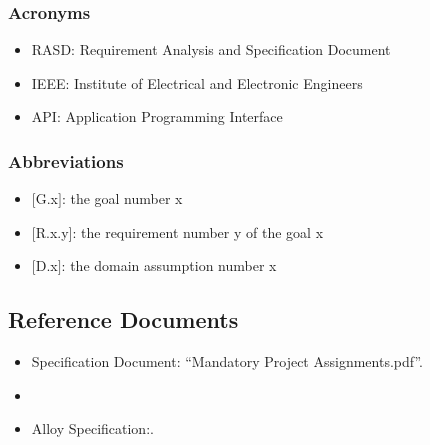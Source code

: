 \subsubsection{Acronyms}
\renewcommand{\labelitemi}{$-$}
\begin{itemize}
\item
RASD: Requirement Analysis and Specification Document
\item
IEEE: Institute of Electrical and Electronic Engineers
\item
API: Application Programming Interface
\end{itemize}

\subsubsection{Abbreviations}
\renewcommand{\labelitemi}{$-$}
\begin{itemize}
\item
$[$G.x$]$: the goal number x
\item
$[$R.x.y$]$: the requirement number y of the goal x
\item
$[$D.x$]$: the domain assumption number x
\end{itemize}

\subsection{Reference Documents}
\renewcommand{\labelitemi}{$-$}
\begin{itemize}
\item
Specification Document: “Mandatory Project Assignments.pdf”.
\item
\href{http://ieeexplore.ieee.org/servlet/opac?punumber=6146377}{\color{Black}{IEEE Std 29148-2011 - ISO/IEC/IEEE International Standard - Systems and software engineering}}
\item
Alloy Specification:\href{http://alloy.mit.edu/alloy/}{\color{Black}{"Software Abstractation, Daniel Jackson}}.
\end{itemize}